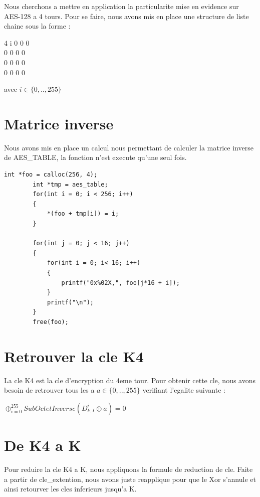 \documentclass[10pt, a4paper]{report}
\begin{document}
	Nous cherchons a mettre en application la particularite mise en evidence sur AES-128 a 4 tours. Pour se faire, nous avons mis en place une structure de liste chaine sous la forme : \\
	\begin{center}
		\begin{tabular}{4}
			i 0 0 0 \\ 0 0 0 0 \\ 0 0 0 0\\ 0 0 0 0\\
		\end{tabular}
		avec \begin{math}
			i \in \{0,..,255\}
		\end{math} \\
	\end{center}


	\section{Matrice inverse}
	Nous avons mis en place un calcul nous permettant de calculer la matrice inverse de AES\_TABLE, la fonction n'est execute qu'une seul fois.
	\begin{lstlisting}[style=CStyle]
		int *foo = calloc(256, 4);
		int *tmp = aes_table;
		for(int i = 0; i < 256; i++)
		{
			*(foo + tmp[i]) = i;
		}
		
		for(int j = 0; j < 16; j++)
		{
			for(int i = 0; i< 16; i++)
			{
				printf("0x%02X,", foo[j*16 + i]);
			}
			printf("\n");
		}
		free(foo);
	\end{lstlisting}

	
	\section{Retrouver la cle K4}
	La cle K4 est la cle d'encryption du 4eme tour. Pour obtenir cette cle, nous avons besoin de retrouver tous les a 
	 \begin{math}
		a \in \{0,..,255\}
	\end{math} verifiant l'egalite suivante : \\ 
	\begin{center}
		\large{\begin{math}
					\oplus^{255}_{i=0} SubOctetInverse(D_{k,I}^i\oplus a) = 0
		\end{math}}\\
	\end{center}
	

	\section{De K4 a K}
	Pour reduire la cle K4 a K, nous appliquons la formule de reduction de cle. Faite a partir de cle\_extention, nous avons juste reapplique pour que le Xor s'annule et ainsi retourver les cles inferieurs jusqu'a K.
	
\end{document}
